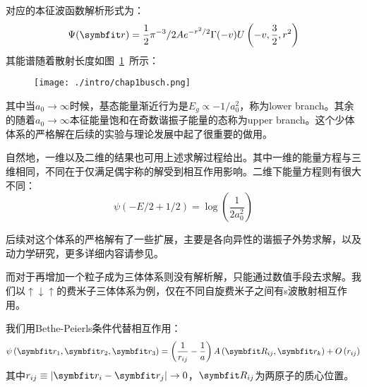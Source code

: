 对应的本征波函数解析形式为：
\begin{equation}
\Psi(\Vector{r})=\frac{1}{2} \pi^{-3} / 2 A e^{-r^{2} / 2} \Gamma(-v) U\left(-v, \frac{3}{2}, r^{2}\right)
\end{equation}
其能谱随着散射长度如图~\ref{chap1busch}~所示：
\begin{figure}[!htbp]
    \centering
    \texttt{[image: ./intro/chap1busch.png]}
    \label{chap1busch}
\end{figure}
其中当$a_0\to \infty$时候，基态能量渐近行为是$E_g\propto - 1/a_0^2$，称为lower branch。其余的随着$a_0\to\infty$本征能量饱和在奇数谐振子能量的态称为upper branch。这个少体体系的严格解在后续的实验与理论发展中起了很重要的做用。

自然地，一维以及二维的结果也可用上述求解过程给出。其中一维的能量方程与三维相同，不同在于仅满足偶宇称的解受到相互作用影响。二维下能量方程则有很大不同：
\begin{equation}
\psi(-E / 2+1 / 2)=\log \left(\frac{1}{2 a_{0}^{2}}\right)
\end{equation}

后续对这个体系的严格解有了一些扩展，主要是各向异性的谐振子外势求解，以及动力学研究，更多详细内容请参见\cite{blume2012few}。

而对于再增加一个粒子成为三体体系则没有解析解，只能通过数值手段去求解。我们以$\uparrow\downarrow\uparrow$的费米子三体体系为例，仅在不同自旋费米子之间有s波散射相互作用\cite{OlshaniiRigorous2001,Petrov2003unitary3b,Fleix2006prlunitary3b,Felix2006praunitary3b,LmDuan2007levelcrossing,Stetcu2007,Blume2008,Blume2010,Xiaji2009prl,Xiaji20103b,Rittenhouse2010green}。

我们用Bethe-Peierls条件代替相互作用：
\begin{equation}
\psi\left(\Vector{r}_{1}, \Vector{r}_{2}, \Vector{r}_{3}\right)=\left(\frac{1}{r_{i j}}-\frac{1}{a}\right) A\left(\Vector{R}_{i j}, \Vector{r}_{k}\right)+O\left(r_{i j}\right)
\end{equation}
其中$r_{i j} \equiv\left|\Vector{r}_{i}-\Vector{r}_{j}\right| \rightarrow 0$，$\Vector{R}_{ij}$为两原子的质心位置。

